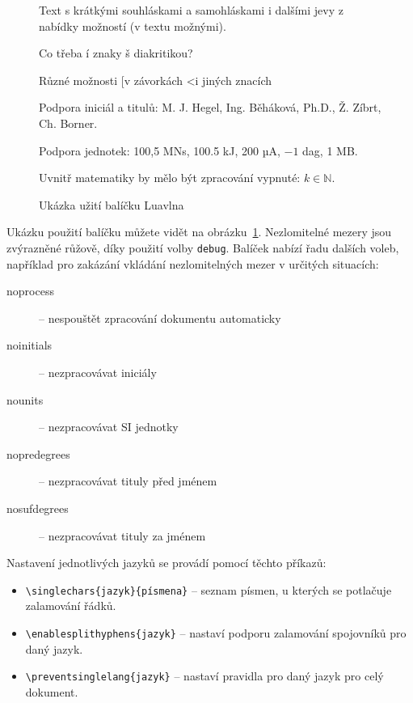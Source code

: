 \documentclass{csbulletin}
\begin{document}
\begin{figure}
  \begin{minipage}{3in}

    \preventsingledebugon

    Text s krátkými souhláskami a samohláskami i dalšími jevy
    z nabídky možností (v textu možnými).

    Co třeba í znaky š diakritikou?

    Různé možnosti [v závorkách \textless i jiných znacích

    Podpora iniciál a titulů: M. J. Hegel, Ing. Běháková, Ph.D., Ž. Zíbrt,
    Ch. Borner.

    Podpora jednotek: 100,5 MN\cdot{}s, 100.5 kJ, 200 µA, $-1$ dag, 1 MB. 

    Uvnitř matematiky by mělo být zpracování vypnuté: $k \in \mathbb N$.

    \preventsingledebugoff
  \end{minipage}
  \caption{Ukázka užití balíčku Luavlna}\label{fig:luavlna}
\end{figure}

Ukázku použití balíčku můžete vidět na obrázku~\ref{fig:luavlna}. Nezlomitelné
mezery jsou zvýrazněné růžově, díky použití volby \texttt{debug}. Balíček
nabízí řadu dalších voleb, například pro zakázání vkládání nezlomitelných 
mezer v určitých situacích:

\begin{description}
  \item [noprocess] – nespouštět zpracování dokumentu automaticky
  \item [noinitials] – nezpracovávat iniciály
  \item [nounits] – nezpracovávat SI jednotky
  \item [nopredegrees] – nezpracovávat tituly před jménem
  \item [nosufdegrees] – nezpracovávat tituly za jménem
\end{description}

Nastavení jednotlivých jazyků se provádí pomocí těchto příkazů:

  \begin{itemize}
    \item\verb|\singlechars{jazyk}{písmena}| – seznam písmen, u kterých se potlačuje zalamování řádků.

    \item\verb|\enablesplithyphens{jazyk}| –  nastaví podporu zalamování spojovníků pro daný jazyk.
    \item\verb|\preventsinglelang{jazyk}| – nastaví pravidla pro daný jazyk pro celý dokument.
  \end{itemize}
\end{document}
